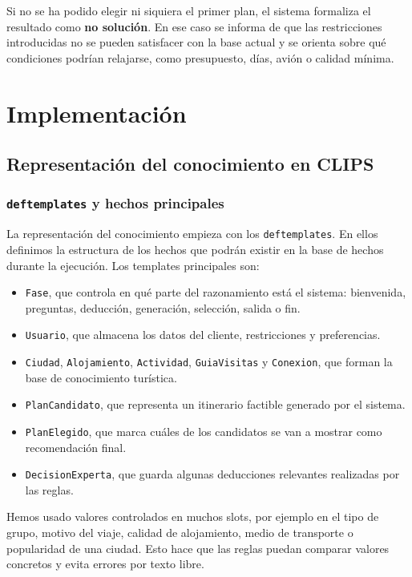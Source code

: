 \documentclass[11pt,a4paper]{article}
\begin{document}
Si no se ha podido elegir ni siquiera el primer plan, el sistema formaliza el
resultado como \textbf{no soluci\'on}. En ese caso se informa de que las
restricciones introducidas no se pueden satisfacer con la base actual y se
orienta sobre qu\'e condiciones podr\'ian relajarse, como presupuesto, d\'ias,
avi\'on o calidad m\'inima.

\section{Implementaci\'on}

\subsection{Representaci\'on del conocimiento en CLIPS}
\subsubsection{\texttt{deftemplates} y hechos principales}
La representaci\'on del conocimiento empieza con los \texttt{deftemplates}. En
ellos definimos la estructura de los hechos que podr\'an existir en la base de
hechos durante la ejecuci\'on. Los templates principales son:
\begin{itemize}
    \item \texttt{Fase}, que controla en qu\'e parte del razonamiento est\'a el
    sistema: bienvenida, preguntas, deducci\'on, generaci\'on, selecci\'on,
    salida o fin.
    \item \texttt{Usuario}, que almacena los datos del cliente, restricciones y
    preferencias.
    \item \texttt{Ciudad}, \texttt{Alojamiento}, \texttt{Actividad},
    \texttt{GuiaVisitas} y \texttt{Conexion}, que forman la base de
    conocimiento tur\'istica.
    \item \texttt{PlanCandidato}, que representa un itinerario factible
    generado por el sistema.
    \item \texttt{PlanElegido}, que marca cu\'ales de los candidatos se van a
    mostrar como recomendaci\'on final.
    \item \texttt{DecisionExperta}, que guarda algunas deducciones relevantes
    realizadas por las reglas.
\end{itemize}

Hemos usado valores controlados en muchos slots, por ejemplo en el tipo de
grupo, motivo del viaje, calidad de alojamiento, medio de transporte o
popularidad de una ciudad. Esto hace que las reglas puedan comparar valores
concretos y evita errores por texto libre.
\end{document}
